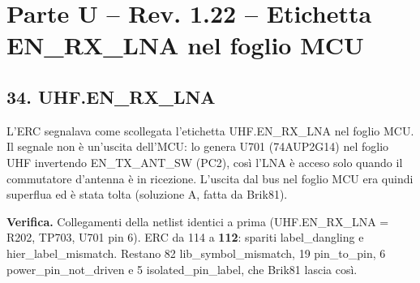 \clearpage
\section[Parte U – Rev. 1.22 – Etichetta EN\_\allowbreak{}RX\_\allowbreak{}LNA nel foglio MCU]{Parte U – Rev. 1.22 – Etichetta EN\_\allowbreak{}RX\_\allowbreak{}LNA nel foglio MCU}

\subsection[34. UHF.EN\_\allowbreak{}RX\_\allowbreak{}LNA]{34. UHF.EN\_\allowbreak{}RX\_\allowbreak{}LNA}

L'ERC segnalava come scollegata l'etichetta UHF.EN\_\allowbreak{}RX\_\allowbreak{}LNA nel foglio MCU. Il segnale non è un'uscita dell'MCU: lo genera U701 (74AUP2G14) nel foglio UHF invertendo EN\_\allowbreak{}TX\_\allowbreak{}ANT\_\allowbreak{}SW (PC2), così l'LNA è acceso solo quando il commutatore d'antenna è in ricezione. L'uscita dal bus nel foglio MCU era quindi superflua ed è stata tolta (soluzione A, fatta da Brik81).

\textbf{Verifica.} Collegamenti della netlist identici a prima (UHF.EN\_\allowbreak{}RX\_\allowbreak{}LNA = R202, TP703, U701 pin 6). ERC da 114 a \textbf{112}: spariti label\_\allowbreak{}dangling e hier\_\allowbreak{}label\_\allowbreak{}mismatch. Restano 82 lib\_\allowbreak{}symbol\_\allowbreak{}mismatch, 19 pin\_\allowbreak{}to\_\allowbreak{}pin, 6 power\_\allowbreak{}pin\_\allowbreak{}not\_\allowbreak{}driven e 5 isolated\_\allowbreak{}pin\_\allowbreak{}label, che Brik81 lascia così.
